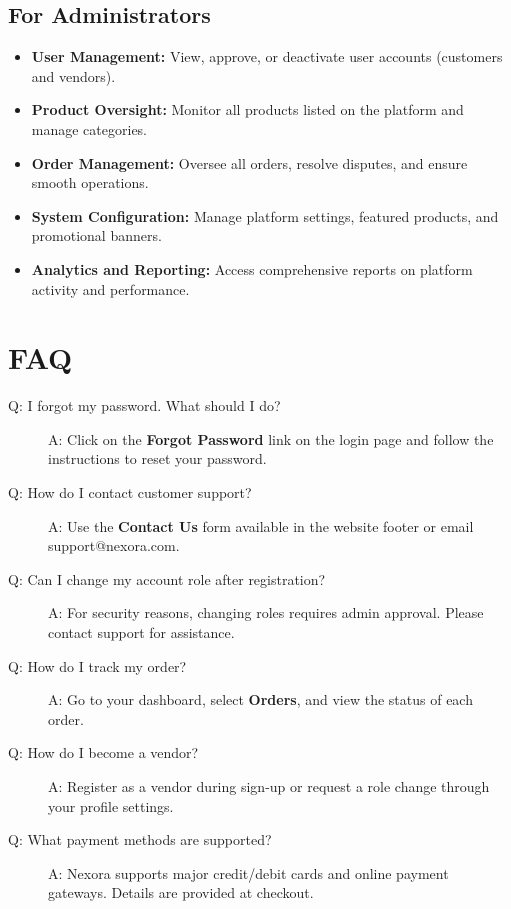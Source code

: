 \subsection{For Administrators}
\begin{itemize}
    \item \textbf{User Management:} View, approve, or deactivate user accounts (customers and vendors).
    \item \textbf{Product Oversight:} Monitor all products listed on the platform and manage categories.
    \item \textbf{Order Management:} Oversee all orders, resolve disputes, and ensure smooth operations.
    \item \textbf{System Configuration:} Manage platform settings, featured products, and promotional banners.
    \item \textbf{Analytics and Reporting:} Access comprehensive reports on platform activity and performance.
\end{itemize}

\section{FAQ}
\begin{description}
    \item[Q: I forgot my password. What should I do?]
    A: Click on the \textbf{Forgot Password} link on the login page and follow the instructions to reset your password.

    \item[Q: How do I contact customer support?]
    A: Use the \textbf{Contact Us} form available in the website footer or email support@nexora.com.

    \item[Q: Can I change my account role after registration?]
    A: For security reasons, changing roles requires admin approval. Please contact support for assistance.

    \item[Q: How do I track my order?]
    A: Go to your dashboard, select \textbf{Orders}, and view the status of each order.

    \item[Q: How do I become a vendor?]
    A: Register as a vendor during sign-up or request a role change through your profile settings.

    \item[Q: What payment methods are supported?]
    A: Nexora supports major credit/debit cards and online payment gateways. Details are provided at checkout.
\end{description} 